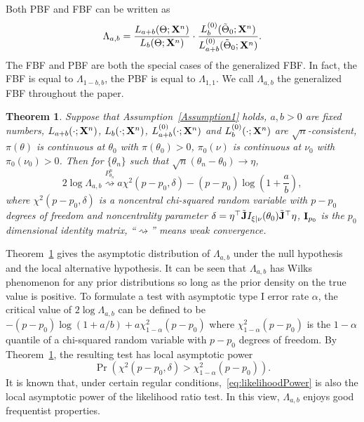 \documentclass[11pt]{article}
\theoremstyle{plain}
\newtheorem{theorem}{\quad\quad Theorem}
\theoremstyle{definition}
\theoremstyle{remark}
\begin{document}
Both PBF and FBF can be written as
$$
    \Lambda_{a,b}=
    \frac{L_{a+b}(\Theta;\mathbf{X}^{n})}{L_{b}(\Theta;\mathbf{X}^{n})}\cdot \frac{L_{b}^{(0)}(\tilde{\Theta}_0;\mathbf{X}^{n})}{L_{a+b}^{(0)}(\tilde{\Theta}_0;\mathbf{X}^{n})}.
$$
The FBF and PBF are both the special cases of the generalized FBF.
In fact, the FBF is equal to $\Lambda_{1-b,b}$, the PBF is equal to $\Lambda_{1,1}$.
We call $\Lambda_{a,b}$ the generalized FBF throughout the paper.



    \begin{theorem}\label{Thm:maintheorem}
        Suppose that Assumption~\ref{Assumption1} holds, $a,b>0$ are fixed numbers, $L_{a+b}(\cdot;\mathbf{X}^{n})$, $L_b(\cdot;\mathbf{X}^{n})$, $L_{a+b}^{(0)}(\cdot;\mathbf{X}^{n})$ and $L_b^{(0)}(\cdot;\mathbf{X}^{n})$ are $\sqrt{n}$-consistent, $\pi(\theta)$ is continuous at $\theta_0$ with $\pi(\theta_0)>0$, $\pi_0(\nu)$ is continuous at $\nu_0$ with $\pi_0(\nu_0)>0$. Then for $\{\theta_n\}$ such that $\sqrt{n}(\theta_n-\theta_0)\to \eta$, 
        $$
        2\log \Lambda_{a,b}\overset{P^n_{\theta_n}}{\rightsquigarrow} 
        {a}\chi^2(p-p_0,\delta)
-{(p-p_0)}\log (1+\frac{a}{b})
        ,
        $$
        where $\chi^2(p-p_0,\delta)$ is a noncentral chi-squared random variable with $p-p_0$ degrees of freedom and noncentrality parameter $\delta=\eta^\top\tilde {\mathbf{J}} I_{\xi|\nu}(\theta_0) \tilde{\mathbf{J}}^\top\eta$,  $\mathbf{I}_{p_0}$ is the $p_0$ dimensional identity matrix,
``$\rightsquigarrow$'' means weak convergence.
    \end{theorem}
Theorem~\ref{Thm:maintheorem} gives the asymptotic distribution of $\Lambda_{a,b}$ under the null hypothesis and the local alternative hypothesis.
It can be seen that $\Lambda_{a,b}$ has Wilks phenomenon for any prior distributions so long as the prior density on the true value is positive.
To formulate a test with asymptotic type I error rate $\alpha$, the critical value of $2\log \Lambda_{a,b}$ can be defined to be $-(p-p_0)\log (1+a/b)+ a\chi^2_{1-\alpha}(p-p_0)$ where $\chi^2_{1-\alpha}(p-p_0)$ is the $1-\alpha$ quantile of a chi-squared random variable with $p-p_0$ degrees of freedom.
By Theorem~\ref{Thm:maintheorem}, the resulting test has local asymptotic power
\begin{equation}\label{eq:likelihoodPower}
\Pr \left( \chi^2(p-p_0,\delta)> \chi^2_{1-\alpha}(p-p_0) \right).
\end{equation}
It is known that, under certain regular conditions,~\eqref{eq:likelihoodPower} is also the local asymptotic power of the likelihood ratio test. 
In this view, $\Lambda_{a,b}$ enjoys good frequentist properties.
\end{document}
